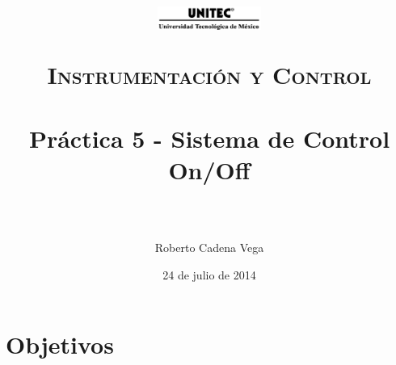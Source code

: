 



\title{
	\normalfont \normalsize
	\begin{figure}[h]
		\begin{center}
			\includegraphics[width=0.3\textwidth]{../images/UNITEC.png} %
		\end{center}
	\end{figure}
	\textsc{Instrumentación y Control} \\ [25pt]
	\horrule{0.5pt} \\[0.4cm] %
	\huge Práctica 5 - Sistema de Control On/Off \\ %
	\horrule{2pt} \\[0.5cm] %
}

\author{Roberto Cadena Vega} %

\date{\normalsize 24 de julio de 2014} %




\maketitle %


\section{Objetivos}


